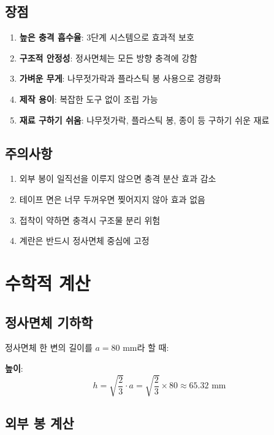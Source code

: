 \documentclass[a4paper,12pt]{article}
\begin{document}
\begin{CJK}{UTF8}{mj}
\subsection{장점}

\begin{enumerate}
    \item \textbf{높은 충격 흡수율}: 3단계 시스템으로 효과적 보호
    \item \textbf{구조적 안정성}: 정사면체는 모든 방향 충격에 강함
    \item \textbf{가벼운 무게}: 나무젓가락과 플라스틱 봉 사용으로 경량화
    \item \textbf{제작 용이}: 복잡한 도구 없이 조립 가능
    \item \textbf{재료 구하기 쉬움}: 나무젓가락, 플라스틱 봉, 종이 등 구하기 쉬운 재료
\end{enumerate}

\subsection{주의사항}

\begin{enumerate}
    \item 외부 봉이 일직선을 이루지 않으면 충격 분산 효과 감소
    \item 테이프 면은 너무 두꺼우면 찢어지지 않아 효과 없음
    \item 접착이 약하면 충격시 구조물 분리 위험
    \item 계란은 반드시 정사면체 중심에 고정
\end{enumerate}

\section{수학적 계산}

\subsection{정사면체 기하학}

정사면체 한 변의 길이를 $a = 80$ mm라 할 때:

\textbf{높이}:
\[
h = \sqrt{\frac{2}{3}} \cdot a = \sqrt{\frac{2}{3}} \times 80 \approx 65.32 \text{ mm}
\]


\subsection{외부 봉 계산}


\end{CJK}
\end{document}
